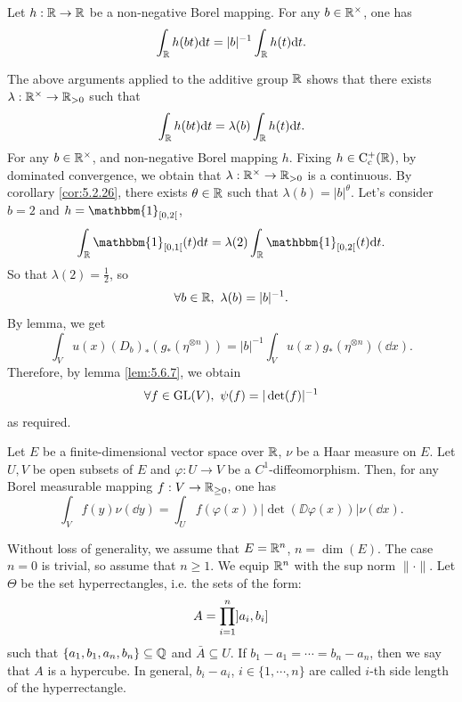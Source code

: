 \begin{lemmaenv}
    Let $h : \mathbb{R} \rightarrow \mathbb{R}$ be a non-negative Borel mapping.
    For any $b \in \mathbb{R}^\times$, one has
    $$\int_{\mathbb{R}} h(bt) \mathrm{d} t = |b|^{-1} \int_{\mathbb{R}} h(t) \mathrm{d} t.$$
\end{lemmaenv}
\begin{proofenv}
    The above arguments applied to the additive group $\mathbb{R}$ shows that there exists $\lambda : \mathbb{R}^\times \rightarrow \mathbb{R}_{>0}$ such that
    $$\int_{\mathbb{R}} h(bt) \mathrm{d} t = \lambda(b) \int_{\mathbb{R}} h(t) \mathrm{d} t.$$
    For any $b \in \mathbb{R}^\times$, and non-negative Borel mapping $h$.
    Fixing $h \in \operatorname{C_{c}^{+}}(\mathbb{R})$, by dominated convergence,
    we obtain that $\lambda : \mathbb{R}^\times \rightarrow \mathbb{R}_{>0}$ is a continuous.
    By corollary \ref{cor:5.2.26}, there exists $\theta \in \mathbb{R}$ such that $\lambda(b) = |b|^{\theta}$.
    Let's consider $b = 2$ and $h = \mathbbm{1}_{\interval[open right]{0}{2}}$,
    $$\int_{\RR} \mathbbm{1}_{\interval[open right]{0}{1}}(t) \dd t = \lambda(2) \int_{\RR} \mathbbm{1}_{\interval[open right]{0}{2}}(t) \dd t.$$
    So that $\lambda(2) = \frac{1}{2}$, so
    $$\forall b \in \mathbb{R},\ \lambda(b) = |b|^{-1}.$$
    By lemma, we get
    $$\int_{V} u(x) (D_b)_*(g_*(\eta^{\otimes n})) = |b|^{-1} \int_{V} u(x) g_{*} (\eta^{\otimes n})(\dd x).$$
    Therefore, by lemma \ref{lem:5.6.7}, we obtain
    $$\forall f \in \operatorname{\mathrm{GL}}(V),\ \psi(f) = |\det(f)|^{-1}$$
    as required.
\end{proofenv}

\begin{theoremenv}
    Let $E$ be a finite-dimensional vector space over $\mathbb{R}$,
    $\nu$ be a Haar measure on $E$.
    Let $U,V$ be open subsets of $E$ and $\varphi : U \rightarrow V$ be a $C^1$-diffeomorphism.
    Then, for any Borel measurable mapping $f : V \rightarrow \mathbb{R}_{\ge 0}$,
    one has
    $$\int_{V} f(y) \nu(\dd y) = \int_{U} f(\varphi(x)) |\det(\DD \varphi(x))| \nu(\dd x).$$
\end{theoremenv}
\begin{proofenv}
    Without loss of generality, we assume that $E = \mathbb{R}^n$, $n = \dim(E)$.
    The case $n = 0$ is trivial, so assume that $n \ge 1$.
    We equip $\mathbb{R}^n$ with the sup norm $\|\cdot\|$.
    Let $\Theta$ be the set hyperrectangles, i.e. the sets of the form:
    $$A = \prod_{i=1}^n \interval[open left]{a_i}{b_i}$$
    such that $\{a_1,b_1,a_n,b_n\} \subseteq \mathbb{Q}$ and $\bar{A} \subseteq U$.
    If $b_1 - a_1 = \cdots = b_n - a_n$, then we say that $A$ is a hypercube.
    In general, $b_i - a_i$, $i \in \{1,\cdots,n\}$ are called $i$-th side length of the hyperrectangle.
\end{proofenv}

